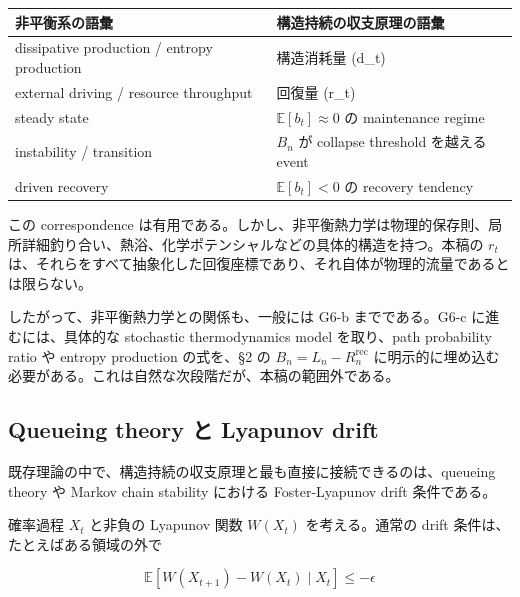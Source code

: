 \documentclass[12pt,a4paper]{article}
\begin{document}
{\def\LTcaptype{table} %
\begin{longtable}[]{@{}
  >{\raggedright\arraybackslash}p{}
  >{\raggedright\arraybackslash}p{}@{}}
\toprule\noalign{}
\begin{minipage}[b]{\linewidth}\raggedright
非平衡系の語彙
\end{minipage} & \begin{minipage}[b]{\linewidth}\raggedright
構造持続の収支原理の語彙
\end{minipage} \\
\midrule\noalign{}
\endhead
\bottomrule\noalign{}
\endlastfoot
dissipative production / entropy production & 構造消耗量 (d\_t) \\
external driving / resource throughput & 回復量 (r\_t) \\
steady state & \(\mathbb E[b_t]\approx 0\) の maintenance regime \\
instability / transition & \(B_n\) が collapse threshold を越える event \\
driven recovery & \(\mathbb E[b_t]<0\) の recovery tendency \\
\end{longtable}
}

この correspondence は有用である。しかし、非平衡熱力学は物理的保存則、局所詳細釣り合い、熱浴、化学ポテンシャルなどの具体的構造を持つ。本稿の \(r_{t}\) は、それらをすべて抽象化した回復座標であり、それ自体が物理的流量であるとは限らない。

したがって、非平衡熱力学との関係も、一般には G6-b までである。G6-c に進むには、具体的な stochastic thermodynamics model を取り、path probability ratio や entropy production の式を、§2 の \(B_{n}=L_{n}-R_{n}^{\mathrm{rec}}\) に明示的に埋め込む必要がある。これは自然な次段階だが、本稿の範囲外である。

\subsection{Queueing theory と Lyapunov drift}\label{queueing-theory-ux3068-lyapunov-drift}

既存理論の中で、構造持続の収支原理と最も直接に接続できるのは、queueing theory や Markov chain stability における Foster-Lyapunov drift 条件である。

確率過程 \(X_{t}\) と非負の Lyapunov 関数 \(W(X_{t})\) を考える。通常の drift 条件は、たとえばある領域の外で

\[
\mathbb E[W(X_{t+1})-W(X_{t})\mid X_{t}]\le -\epsilon
\]
\end{document}
